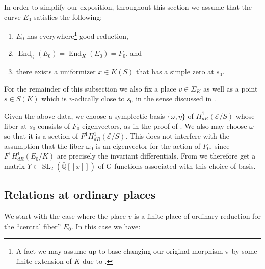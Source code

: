\documentclass[12pt,twoside,a4paper]{article}
\theoremstyle{plain}%
\DeclareMathOperator{\End}{End}
\DeclareMathOperator{\SL}{SL}
\newcommand{\Q}{\mathbb{Q}}
\newcommand{\CE}{\mathcal{E}}
\begin{document}
In order to simplify our exposition, throughout this section we assume that the curve $E_0$ satisfies the following:\begin{enumerate}
	\item $E_0$ has everywhere\footnote{A fact we may assume up to base changing our original morphism $\pi$ by some finite extension of $K$ due to \cite{serretate}.} good reduction,
	
	\item $\End_{\bar{\Q}}(E_0)=\End_K(E_0)=F_0$, and 
	
	\item there exists a uniformizer $x\in K(S)$ that has a simple zero at $s_0$.
\end{enumerate}

For the remainder of this subsection we also fix a place $v\in \Sigma_{K}$ as well as a point $s\in S(K)$ which is $v$-adically close to $s_0$ in the sense discussed in .

Given the above data, we choose a symplectic basis $\{\omega,\eta\}$ of $H^1_{dR}(\CE/S)$ whose fiber at $s_0$ consists of $F_0$-eigenvectors, as in the proof of . We also may choose $\omega$ so that it is a section of $F^1H^1_{dR}(\CE/S)$. This does not interfere with the assumption that the fiber $\omega_{0}$ is an eigenvector for the action of $F_0$, since $F^1H^1_{dR}(E_0/K)$ are precisely the invariant differentials. From  we therefore get a matrix $Y\in \SL_2(\bar{\Q}[[x]])$ of G-functions associated with this choice of basis.


	

\subsection{Relations at ordinary places}\label{section:cmordpadic}
We start with the case where the place $v$ is a finite place of ordinary reduction for the ``central fiber'' $E_{0}$. In this case we have:
\end{document}
